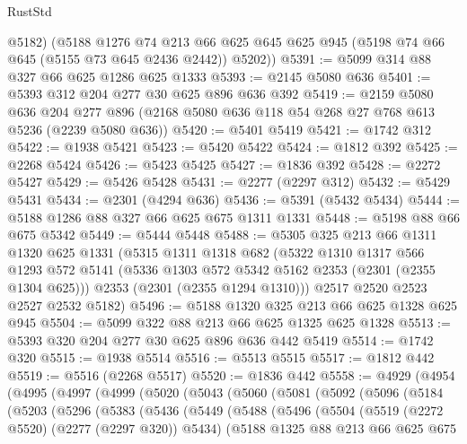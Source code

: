 \begin{lexlean}{RustStd}
\begin{coremodule}
        @5182)
      (@5188
        @1276
        @74
        @213
        @66
        @625
        @645
        @625
        @945
        (@5198 @74 @66 @645 (@5155 @73 @645 @2436 @2442))
        @5202))
@5391 := @5099 @314 @88 @327 @66 @625 @1286 @625 @1333
@5393 := @2145 @5080 @636
@5401 := @5393 @312 @204 @277 @30 @625 @896 @636 @392
@5419 := @2159
    @5080
    @636
    @204
    @277
    @896
    (@2168 @5080 @636 @118 @54 @268 @27 @768 @613 @5236 (@2239 @5080 @636))
@5420 := @5401 @5419
@5421 := @1742 @312
@5422 := @1938 @5421
@5423 := @5420 @5422
@5424 := @1812 @392
@5425 := @2268 @5424
@5426 := @5423 @5425
@5427 := @1836 @392
@5428 := @2272 @5427
@5429 := @5426 @5428
@5431 := @2277 (@2297 @312)
@5432 := @5429 @5431
@5434 := @2301 (@4294 @636)
@5436 := @5391 (@5432 @5434)
@5444 := @5188 @1286 @88 @327 @66 @625 @675 @1311 @1331
@5448 := @5198 @88 @66 @675 @5342
@5449 := @5444 @5448
@5488 := @5305
    @325
    @213
    @66
    @1311
    @1320
    @625
    @1331
    (@5315
      @1311
      @1318
      @682
      (@5322
        @1310
        @1317
        @566
        @1293
        @572
        @5141
        (@5336 @1303 @572 @5342 @5162 @2353 (@2301 (@2355 @1304 @625)))
        @2353
        (@2301 (@2355 @1294 @1310)))
      @2517
      @2520
      @2523
      @2527
      @2532
      @5182)
@5496 := @5188 @1320 @325 @213 @66 @625 @1328 @625 @945
@5504 := @5099 @322 @88 @213 @66 @625 @1325 @625 @1328
@5513 := @5393 @320 @204 @277 @30 @625 @896 @636 @442 @5419
@5514 := @1742 @320
@5515 := @1938 @5514
@5516 := @5513 @5515
@5517 := @1812 @442
@5519 := @5516 (@2268 @5517)
@5520 := @1836 @442
@5558 := @4929
    (@4954
      (@4995
        (@4997
          (@4999
            (@5020
              (@5043
                (@5060
                  (@5081
                    (@5092
                      (@5096
                        (@5184
                          (@5203
                            (@5296
                              (@5383
                                (@5436
                                  (@5449
                                    (@5488
                                      (@5496
                                        (@5504
                                          (@5519 (@2272 @5520) (@2277 (@2297 @320)) @5434)
                                          (@5188
                                            @1325
                                            @88
                                            @213
                                            @66
                                            @625
                                            @675

\end{coremodule}
\end{lexlean}
